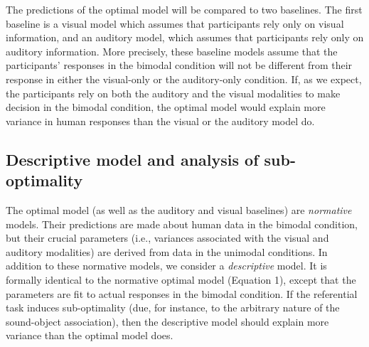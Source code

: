 \documentclass[english,floatsintext,man]{apa6}
\theoremstyle{definition}
\theoremstyle{definition}
\theoremstyle{definition}
\theoremstyle{remark}
\begin{document}
The predictions of the optimal model will be compared to two baselines.
The first baseline is a visual model which assumes that participants
rely only on visual information, and an auditory model, which assumes
that participants rely only on auditory information. More precisely,
these baseline models assume that the participants' responses in the
bimodal condition will not be different from their response in either
the visual-only or the auditory-only condition. If, as we expect, the
participants rely on both the auditory and the visual modalities to make
decision in the bimodal condition, the optimal model would explain more
variance in human responses than the visual or the auditory model do.

\subsection{Descriptive model and analysis of
sub-optimality}\label{descriptive-model-and-analysis-of-sub-optimality}

The optimal model (as well as the auditory and visual baselines) are
\emph{normative} models. Their predictions are made about human data in
the bimodal condition, but their crucial parameters (i.e., variances
associated with the visual and auditory modalities) are derived from
data in the unimodal conditions. In addition to these normative models,
we consider a \emph{descriptive} model. It is formally identical to the
normative optimal model (Equation 1), except that the parameters are fit
to actual responses in the bimodal condition. If the referential task
induces sub-optimality (due, for instance, to the arbitrary nature of
the sound-object association), then the descriptive model should explain
more variance than the optimal model does.
\end{document}
